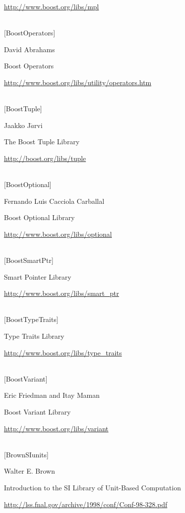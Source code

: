 \url{http://www.boost.org/libs/mpl}

\hspace*{\fill} \\ %
{[BoostOperators]}

David Abrahams

Boost Operators

\url{http://www.boost.org/libs/utility/operators.htm}

\hspace*{\fill} \\ %
{[BoostTuple]}

Jaakko J$\ddot{a}$rvi

The Boost Tuple Library

\url{http://boost.org/libs/tuple}

\hspace*{\fill} \\ %
{[BoostOptional]}

Fernando Luis Cacciola Carballal

Boost Optional Library

\url{http://www.boost.org/libs/optional}

\hspace*{\fill} \\ %
{[BoostSmartPtr]}

Smart Pointer Library

\url{http://www.boost.org/libs/smart_ptr}

\hspace*{\fill} \\ %
{[BoostTypeTraits]}

Type Traits Library

\url{http://www.boost.org/libs/type_traits}

\hspace*{\fill} \\ %
{[BoostVariant]}

Eric Friedman and Itay Maman

Boost Variant Library

\url{http://www.boost.org/libs/variant}

\hspace*{\fill} \\ %
{[BrownSIunits]}

Walter E. Brown

Introduction to the SI Library of Unit-Based Computation

\url{http://lss.fnal.gov/archive/1998/conf/Conf-98-328.pdf}

